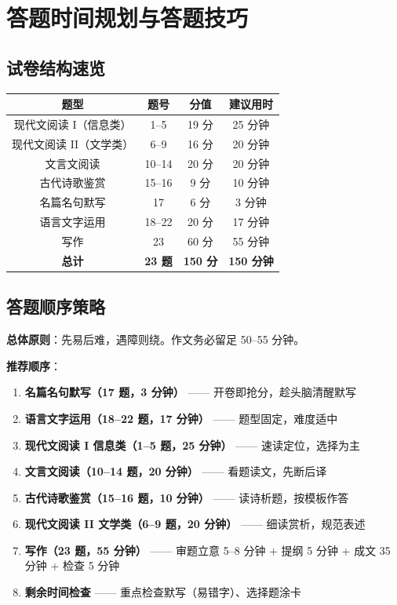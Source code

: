 \section{答题时间规划与答题技巧}

\subsection{试卷结构速览}

\begin{center}
\begin{tabular}{c|c|c|c}
\textbf{题型} & \textbf{题号} & \textbf{分值} & \textbf{建议用时} \\ \hline
现代文阅读 I（信息类） & 1--5 & 19 分 & 25 分钟 \\
现代文阅读 II（文学类） & 6--9 & 16 分 & 20 分钟 \\
文言文阅读 & 10--14 & 20 分 & 20 分钟 \\
古代诗歌鉴赏 & 15--16 & 9 分 & 10 分钟 \\
名篇名句默写 & 17 & 6 分 & 3 分钟 \\
语言文字运用 & 18--22 & 20 分 & 17 分钟 \\
写作 & 23 & 60 分 & 55 分钟 \\ \hline
\textbf{总计} & \textbf{23 题} & \textbf{150 分} & \textbf{150 分钟}
\end{tabular}
\end{center}

\subsection{答题顺序策略}

\textbf{总体原则}：先易后难，遇障则绕。作文务必留足 50--55 分钟。

\textbf{推荐顺序}：

\begin{enumerate}
  \item \textbf{名篇名句默写（17 题，3 分钟）} —— 开卷即抢分，趁头脑清醒默写
  \item \textbf{语言文字运用（18--22 题，17 分钟）} —— 题型固定，难度适中
  \item \textbf{现代文阅读 I 信息类（1--5 题，25 分钟）} —— 速读定位，选择为主
  \item \textbf{文言文阅读（10--14 题，20 分钟）} —— 看题读文，先断后译
  \item \textbf{古代诗歌鉴赏（15--16 题，10 分钟）} —— 读诗析题，按模板作答
  \item \textbf{现代文阅读 II 文学类（6--9 题，20 分钟）} —— 细读赏析，规范表述
  \item \textbf{写作（23 题，55 分钟）} —— 审题立意 5--8 分钟 + 提纲 5 分钟 + 成文 35 分钟 + 检查 5 分钟
  \item \textbf{剩余时间检查} —— 重点检查默写（易错字）、选择题涂卡
\end{enumerate}

